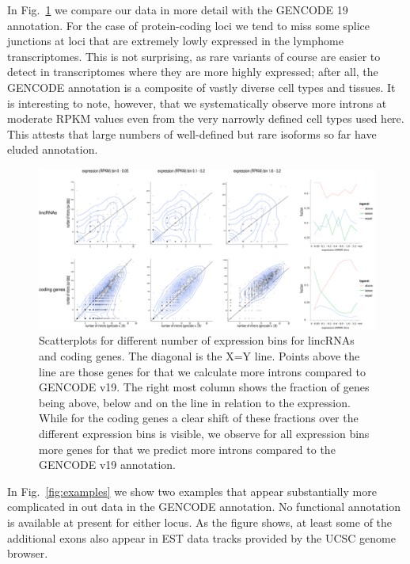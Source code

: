 \documentclass[ncrna,article,submit,moreauthors,pdftex,10pt,a4paper]{mdpi}
\begin{document}
In Fig.~\ref{fig:compare} we compare our data in more detail with the
GENCODE 19 annotation. For the case of protein-coding loci we tend to miss
some splice junctions at loci that are extremely lowly expressed in the
lymphome transcriptomes. This is not surprising, as rare variants of course
are easier to detect in transcriptomes where they are more highly
expressed; after all, the GENCODE annotation is a composite of vastly
diverse cell types and tissues. It is interesting to note, however, that we
systematically observe more introns at moderate RPKM values even from the
very narrowly defined cell types used here. This attests that large numbers
of well-defined but rare isoforms so far have eluded annotation. 

\begin{figure}[ht]
  \begin{center}
    \includegraphics[width=\textwidth]{Fig1}
  \end{center}
  \caption{Scatterplots for different number of expression bins for lincRNAs and coding genes. 
The diagonal is the X=Y line. Points above the line are those genes for that we calculate more introns compared to GENCODE v19.
The right most column shows the fraction of genes being above, below and on the line  in relation to the expression.
While for the coding genes a clear shift of these fractions over the different expression bins is visible, we observe for all expression bins more genes for that we predict more introns compared to the GENCODE v19 annotation.}  
  \label{fig:compare}
\end{figure}

In Fig.~\ref{fig:examples} we show two examples that appear substantially
more complicated in out data in the GENCODE annotation. No functional
annotation is available at present for either locus. As the figure shows,
at least some of the additional exons also appear in EST data tracks
provided by the UCSC genome browser. 
\end{document}
